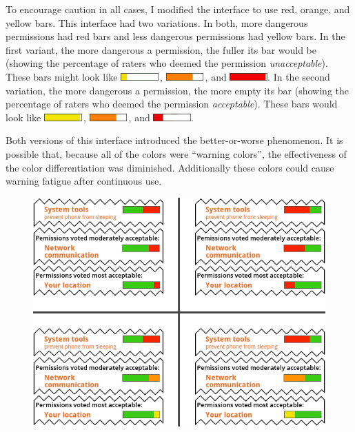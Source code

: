 \documentclass[11pt]{article}
\begin{document}
To encourage caution in all cases, I modified the interface to use 
red, orange, and yellow bars. This interface had 
two variations. In both, more dangerous permissions had red
bars and less dangerous permissions had yellow bars. In the first variant, the more 
dangerous a permission, the fuller its bar would be (showing the percentage of 
raters who deemed the permission \emph{unacceptable}). These bars might look like \includegraphics[height=8pt]{img/Bars3/RedBig/YellowWhiteBar.png}\,,
\includegraphics[height=8pt]{img/Bars3/RedBig/OrangeWhiteBar.png}\,, and 
\includegraphics[height=8pt]{img/Bars3/RedBig/RedWhiteBar.png}. In the second variation, the more
dangerous a permission, the more empty its bar (showing the percentage of raters who 
deemed the permission \emph{acceptable}). These bars would look like 
\includegraphics[height=8pt]{img/Bars3/RedSmall/YellowWhiteBar.png}\,,
\includegraphics[height=8pt]{img/Bars3/RedSmall/OrangeWhiteBar.png}\,, and
\includegraphics[height=8pt]{img/Bars3/RedSmall/RedWhiteBar.png}.

Both versions of this interface introduced the 
better-or-worse phenomenon. It is possible that,
because all of the colors were ``warning colors'', the effectiveness of the color 
differentiation was diminished. Additionally
these colors could cause warning fatigue after continuous use.


\begin{figure}
\begin{center}
\includegraphics[width=.9\linewidth]{candidate-img/bars/barsR4.png}
\end{center}
\end{figure}
\end{document}
